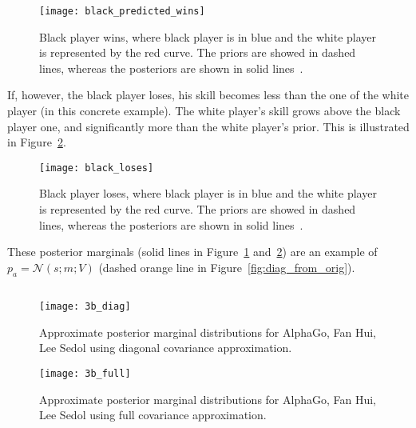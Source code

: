 \documentclass[a4paper,11pt]{article}
\theoremstyle{mytheor}
\begin{document}
\begin{figure}[htpb!]
    \centering
    \texttt{[image: black\_predicted\_wins]}
    \caption{Black player wins, where black player is in blue and the white player is represented by the red curve. The priors are showed in dashed lines, whereas the posteriors are shown in solid lines~\cite{bishop2013model}.}
    \label{fig:black_predicted_wins}
\end{figure}

If, however, the black player loses, his skill becomes less than the one of the white player (in this concrete example). The white player's skill grows above the black player one, and significantly more than the white player's prior. This is illustrated in Figure~\ref{fig:black_loses}.

\begin{figure}[htpb!]
    \centering
    \texttt{[image: black\_loses]}
    \caption{Black player loses, where black player is in blue and the white player is represented by the red curve. The priors are showed in dashed lines, whereas the posteriors are shown in solid lines~\cite{bishop2013model}.}
    \label{fig:black_loses}
\end{figure}


These posterior marginals (solid lines in Figure~\ref{fig:black_predicted_wins} and~\ref{fig:black_loses}) are an example of $p_a=\mathcal{N}(s;m;V)$ (dashed orange line in Figure~\ref{fig:diag_from_orig}).


\subsection{}
\label{sec:3c}

\begin{figure}[htpb!]
    \centering
    \texttt{[image: 3b\_diag]}
    \caption{Approximate posterior marginal distributions for AlphaGo, Fan Hui, Lee Sedol using diagonal covariance approximation.}
    \label{fig:3b_diag}
\end{figure}

\begin{figure}[htpb!]
    \centering
    \texttt{[image: 3b\_full]}
    \caption{Approximate posterior marginal distributions for AlphaGo, Fan Hui, Lee Sedol using full covariance approximation.}
    \label{fig:3b_full}
\end{figure}
\end{document}
